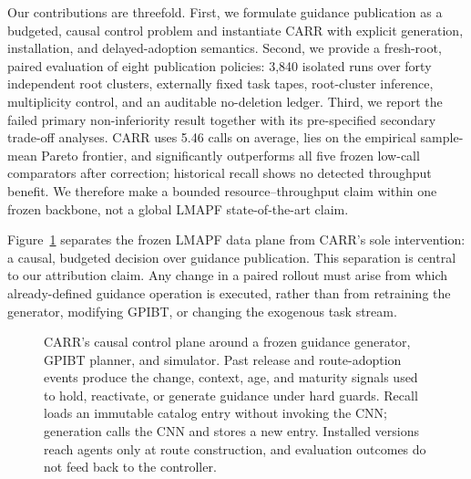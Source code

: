 \documentclass[sigconf,review,anonymous]{acmart}
\newcommand{\carr}{\textsc{CARR}\xspace}
\begin{document}
Our contributions are threefold. First, we formulate guidance publication as
a budgeted, causal control problem and instantiate \carr with explicit
generation, installation, and delayed-adoption semantics. Second, we provide a
fresh-root, paired evaluation of eight publication policies: 3{,}840 isolated
runs over forty independent root clusters, externally fixed task tapes,
root-cluster inference, multiplicity control, and an auditable no-deletion
ledger. Third, we report the failed primary non-inferiority result together
with its pre-specified secondary trade-off analyses. \carr uses 5.46 calls on
average, lies on the empirical sample-mean Pareto frontier, and significantly
outperforms all five frozen low-call comparators after correction; historical
recall shows no detected throughput benefit. We therefore make a bounded
resource--throughput claim within one frozen backbone, not a global LMAPF
state-of-the-art claim.

Figure~\ref{fig:carr-framework} separates the frozen LMAPF data plane from
\carr's sole intervention: a causal, budgeted decision over guidance
publication. This separation is central to our attribution claim. Any change
in a paired rollout must arise from which already-defined guidance operation
is executed, rather than from retraining the generator, modifying GPIBT, or
changing the exogenous task stream.

\begin{figure}[t]
\centering
\resizebox{\textwidth}{!}{}
\caption{CARR's causal control plane around a frozen guidance generator,
GPIBT planner, and simulator. Past release and route-adoption events produce
the change, context, age, and maturity signals used to hold, reactivate, or
generate guidance under hard guards. Recall loads an immutable catalog entry
without invoking the CNN; generation calls the CNN and stores a new entry.
Installed versions reach agents only at route construction, and evaluation
outcomes do not feed back to the controller.}
\label{fig:carr-framework}
\end{figure}
\end{document}
